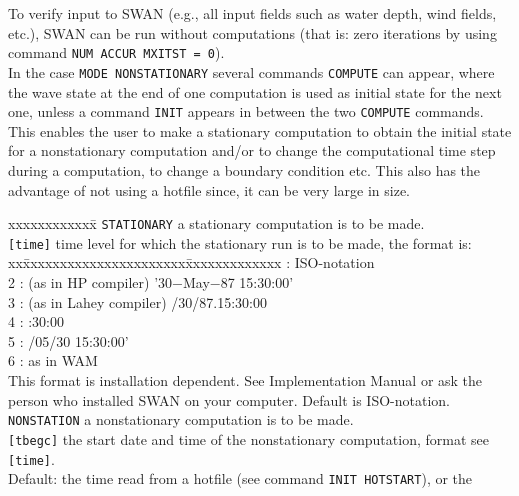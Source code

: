\documentclass[12pt]{book}
\begin{document}
\noindent
To verify input to SWAN (e.g., all input fields such as water depth, wind fields, etc.), SWAN can be run
without computations (that is: zero iterations by using command {\tt NUM ACCUR MXITST = 0}).
\\[2ex]
In the case {\tt MODE NONSTATIONARY} several commands {\tt COMPUTE} can appear, where the wave state
at the end of one computation is used as initial state for the next one, unless a command {\tt INIT} appears
in between the two {\tt COMPUTE} commands. This enables the user to make a stationary computation to
obtain the initial state for a nonstationary computation and/or to change the computational time step
during a computation, to change a boundary condition etc. This also has the advantage of not using a hotfile
since, it can be very large in size.

\begin{tabbing}
 xxxxxxxxxxxx\= \kill
{\tt STATIONARY} \> a stationary computation is to be made.\\
{\tt [time]}     \> time level for which the stationary run is to be made, the format is:\+\\
                       \pushtabs
                       xx\=xxxxxxxxxxxxxxxxxxxxxx\=xxxxxxxxxxxxx  \>: ISO-notation                     \\
                       2 \>: (as in HP compiler)    \> '30$-$May$-$87 15:30:00' \\
                       3 \>: (as in Lahey compiler) /30/87.15:30:00        \\
                       4 \>:                        :30:00                 \\
                       5 \>:                        /05/30 15:30:00'       \\
                       6 \>: as in WAM                             \\
                       \poptabs
                       This format is installation dependent. See Implementation Manual or ask the\\
                       person who installed SWAN on your computer. Default is ISO-notation.\-\\
{\tt NONSTATION}    \> a nonstationary computation is to be made.\\
{\tt [tbegc]}       \> the start date and time of the nonstationary computation, format see {\tt [time]}.\+\\
                       Default: the time read from a hotfile (see command {\tt INIT HOTSTART}), or the\\

\end{tabbing}
\end{document}
